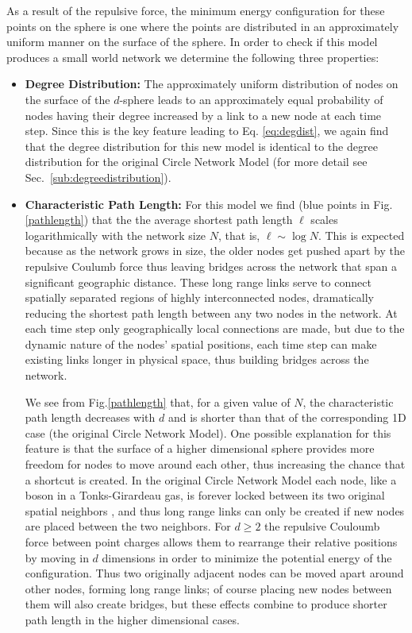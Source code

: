 \documentclass[aps,pre,manuscript,superscriptaddress,amsmath,amssymb,nofootinbib]{revtex4-1}
\begin{document}
As a result of the repulsive force, the minimum energy configuration for these points on the sphere is one where the points are distributed in an approximately uniform manner on the surface of the sphere.
In order to check if this model produces a small world network we determine the following three properties:
\begin{itemize}
  \item \textbf{Degree Distribution:} The approximately uniform distribution of nodes on the surface of the $d$-sphere leads to an approximately equal probability of nodes having their degree increased by a link to a new node at each time step.
Since this is the key feature leading to Eq. \eqref{eq:degdist}, we again find that the degree distribution for this new model is identical to the degree distribution for the original Circle Network Model (for more detail see Sec.~\ref{sub:degreedistribution}).
  \item \textbf{Characteristic Path Length:} For this model we find (blue points in Fig.\ref{pathlength}) that the the average shortest path length $\ell$ scales logarithmically with the network size $N$, that is, $\ell \sim \log N$. 
This is expected because as the network grows in size, the older nodes get pushed apart by the repulsive Coulumb force thus leaving bridges across the network that span a significant geographic distance.
These long range links serve to connect spatially separated regions of highly interconnected nodes, dramatically reducing the shortest path length between any two nodes in the network.
At each time step only geographically local connections are made, but due to the dynamic nature of the nodes' spatial positions, each time step can make existing links longer in physical space, thus building bridges across the network.

\indent We see from Fig.\ref{pathlength} that, for a given value of $N$, the characteristic path length decreases with $d$ and is shorter than that of the corresponding 1D case (the original Circle Network Model).
One possible explanation for this feature is that the surface of a higher dimensional sphere provides more freedom for nodes to move around each other, thus increasing the chance that a shortcut is created.
In the original Circle Network Model each node, like a boson in a Tonks-Girardeau gas, is forever locked between its two original spatial neighbors \cite{girardeau}, and thus long range links can only be created if new nodes are placed between the two neighbors.
For $d \geq 2$ the repulsive Couloumb force between point charges allows them to rearrange their relative positions by moving in $d$ dimensions in order to minimize the potential energy of the configuration.
Thus two originally adjacent nodes can be moved apart around other nodes, forming long range links; of course placing new nodes between them will also create bridges, but these effects combine to produce shorter path length in the higher dimensional cases.


\end{itemize}
\end{document}
